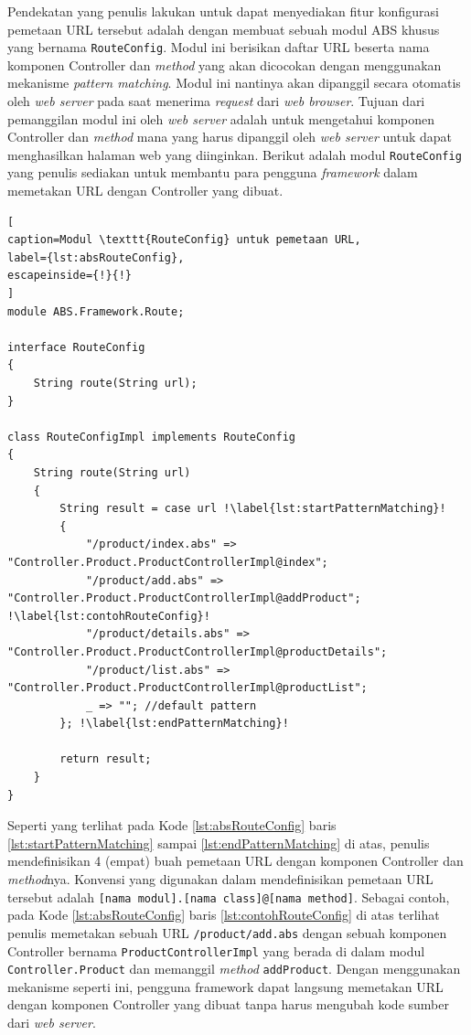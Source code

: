 Pendekatan yang penulis lakukan untuk dapat menyediakan fitur konfigurasi pemetaan URL tersebut adalah dengan membuat sebuah modul ABS khusus yang bernama \texttt{RouteConfig}. Modul ini berisikan daftar URL beserta nama komponen Controller dan \textit{method} yang akan dicocokan dengan menggunakan mekanisme \textit{pattern matching}. Modul ini nantinya akan dipanggil secara otomatis oleh \textit{web server} pada saat menerima \textit{request} dari \textit{web browser}. Tujuan dari pemanggilan modul ini oleh \textit{web server} adalah untuk mengetahui komponen Controller dan \textit{method} mana yang harus dipanggil oleh \textit{web server} untuk dapat menghasilkan halaman web yang diinginkan. Berikut adalah modul \texttt{RouteConfig} yang penulis sediakan untuk membantu para pengguna \textit{framework} dalam memetakan URL dengan Controller yang dibuat.

\begin{minipage}{\linewidth}
\begin{lstlisting}[
caption=Modul \texttt{RouteConfig} untuk pemetaan URL,
label={lst:absRouteConfig},
escapeinside={!}{!}
]
module ABS.Framework.Route;

interface RouteConfig
{
	String route(String url);
}

class RouteConfigImpl implements RouteConfig
{
	String route(String url)
	{
		String result = case url !\label{lst:startPatternMatching}!
		{
			"/product/index.abs" => "Controller.Product.ProductControllerImpl@index";
			"/product/add.abs" => "Controller.Product.ProductControllerImpl@addProduct"; !\label{lst:contohRouteConfig}!
			"/product/details.abs" => "Controller.Product.ProductControllerImpl@productDetails";
			"/product/list.abs" => "Controller.Product.ProductControllerImpl@productList";
			_ => ""; //default pattern
		}; !\label{lst:endPatternMatching}!
		
		return result;
	}
}
\end{lstlisting}
\end{minipage}

Seperti yang terlihat pada Kode \ref{lst:absRouteConfig} baris \ref{lst:startPatternMatching} sampai \ref{lst:endPatternMatching} di atas, penulis mendefinisikan 4 (empat) buah pemetaan URL dengan komponen Controller dan \textit{method}nya. Konvensi yang digunakan dalam mendefinisikan pemetaan URL tersebut adalah \texttt{[nama modul].[nama class]@[nama method]}. Sebagai contoh, pada Kode \ref{lst:absRouteConfig} baris \ref{lst:contohRouteConfig} di atas terlihat penulis memetakan sebuah URL \texttt{/product/add.abs} dengan sebuah komponen Controller bernama \texttt{ProductControllerImpl} yang berada di dalam modul \texttt{Controller.Product} dan memanggil \textit{method} \texttt{addProduct}. Dengan menggunakan mekanisme seperti ini, pengguna framework dapat langsung memetakan URL dengan komponen Controller yang dibuat tanpa harus mengubah kode sumber dari \textit{web server}.\\


